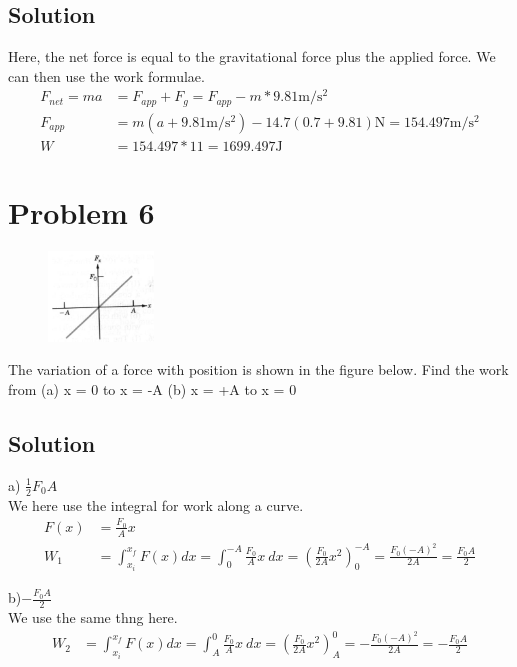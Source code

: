 \documentclass[12pt]{article}
\begin{document}
\subsection*{Solution}
Here, the net force is equal to the gravitational force plus the applied force. We can then use the work formulae.
\begin{align*}
    F_{net} = 
    ma  &=  F_{app} + F_g = F_{app} - m*9.81\unit{\meter/\second^2}\\
    F_{app} &= m(a + 9.81\unit{\meter/\second^2}) - 14.7(0.7 + 9.81)\unit{\newton}
            = 154.497 \unit{\meter/\second^2}\\
    W   &=  154.497 * 11 = \boxed{1699.497\unit{\joule}}
\end{align*}

\pagebreak
\section*{Problem 6}

\begin{figure}
    \vspace{-50pt}
    \includegraphics[width=0.25\textwidth]{graph_6.png} 
\end{figure}
The variation of a force with position is shown in the figure below. Find the work from (a) x = 0 to x = -A (b) x = +A to x = 0

\subsection*{Solution}
a) $\frac{1}{2}F_0 A$\\
We here use the integral for work along a curve.
\begin{align*}
    F(x)    &=  \frac{F_0}{A} x\\
    W_1 &= \int_{x_i}^{x_f} F(x) dx 
        = \int_0^{-A} \frac{F_0}{A}x\ dx 
        = \left(\frac{F_0}{2A}x^2\right)_0^{-A} 
        = \frac{F_0 (-A)^2}{2A} = \boxed{\frac{F_0 A}{2}}
\end{align*}

b)$-\frac{F_0 A}{2}$\\
We use the same thng here.
\begin{align*}
    W_2 &= \int_{x_i}^{x_f} F(x) dx 
        = \int_A^0 \frac{F_0}{A}x\ dx 
        = \left(\frac{F_0}{2A}x^2\right)_A^0 
        = -\frac{F_0 (-A)^2}{2A} = \boxed{-\frac{F_0 A}{2}}
\end{align*}
\end{document}
